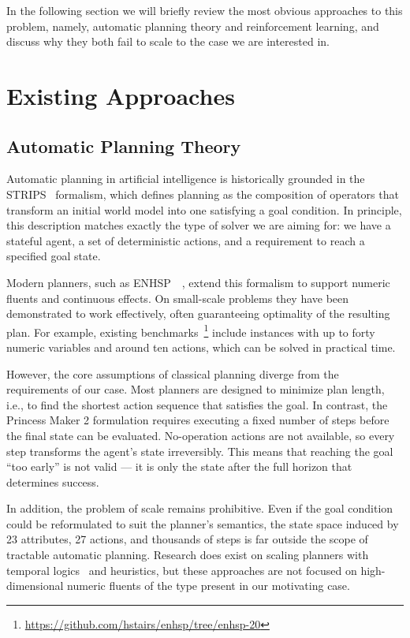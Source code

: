 \documentclass[12pt, a4paper]{report}
\begin{document}
	In the following section we will briefly review the most obvious approaches to this problem, namely, automatic planning theory and reinforcement learning, and discuss why they both fail to scale to the case we are interested in.
	
	\section{Existing Approaches}
	
	\subsection{Automatic Planning Theory}
	
	Automatic planning in artificial intelligence is historically grounded in the STRIPS~\cite{fikes1971strips} formalism, which defines planning as the composition of operators that transform an initial world model into one satisfying a goal condition.
	In principle, this description matches exactly the type of solver we are aiming for: we have a stateful agent, a set of deterministic actions, and a requirement to reach a specified goal state.
	
	Modern planners, such as ENHSP~\cite{enhsp::scala2020subgoaling}~\cite{enhsp::Scala2016IntervalBasedRF}, extend this formalism to support numeric fluents and continuous effects. 
	On small-scale problems they have been demonstrated to work effectively, often guaranteeing optimality of the resulting plan.
	For example, existing benchmarks~\footnote{\url{https://github.com/hstairs/enhsp/tree/enhsp-20}} include instances with up to forty numeric variables and around ten actions, which can be solved in practical time.
	
	However, the core assumptions of classical planning diverge from the requirements of our case.
	Most planners are designed to minimize plan length, i.e., to find the shortest action sequence that satisfies the goal.
	In contrast, the Princess Maker 2 formulation requires executing a fixed number of steps before the final state can be evaluated.
	No-operation actions are not available, so every step transforms the agent’s state irreversibly.
	This means that reaching the goal “too early” is not valid — it is only the state after the full horizon that determines success.
	
	In addition, the problem of scale remains prohibitive.
	Even if the goal condition could be reformulated to suit the planner’s semantics, the state space induced by 23 attributes, 27 actions, and thousands of steps is far outside the scope of tractable automatic planning.
	Research does exist on scaling planners with temporal logics~\cite{LU2025121666} and heuristics, but these approaches are not focused on high-dimensional numeric fluents of the type present in our motivating case.
	
\end{document}
